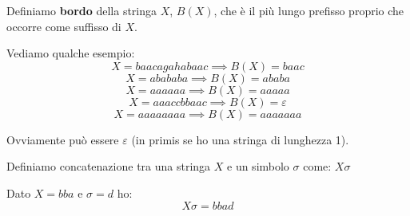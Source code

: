 \begin{definizione}
  Definiamo \textbf{bordo} della stringa $X$, $B(X)$, che è il più lungo
  prefisso proprio che occorre come suffisso di $X$.
  \begin{esempio}
    Vediamo qualche esempio:
    \[X=baacagahabaac\implies B(X)=baac\]
    \[X=abababa\implies B(X)=ababa\]
    \[X=aaaaaa\implies B(X)=aaaaa\]
    \[X=aaaccbbaac\implies B(X)=\varepsilon\]
    \[X=aaaaaaaa\implies B(X)=aaaaaaa\]
  \end{esempio}
  Ovviamente può essere $\varepsilon$ (in primis se ho una stringa di lunghezza
  1).
\end{definizione}
\begin{definizione}
  Definiamo concatenazione tra una stringa $X$ e un simbolo $\sigma$ come:
  $X\sigma$
\end{definizione}
\begin{esempio}
  Dato $X=bba$ e $\sigma=d$ ho:
  \[X\sigma = bbad\]
\end{esempio}

